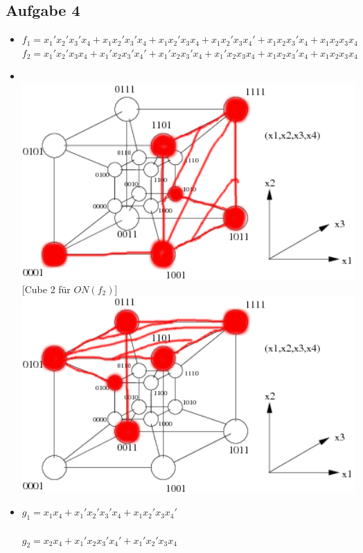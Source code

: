 \documentclass{scrartcl}
\begin{document}
	\subsection*{Aufgabe 4}
    \begin{itemize}
        \item[a)] 
            $f_1 = x_1'x_2'x_3'x_4 + x_1x_2'x_3'x_4  + x_1x_2'x_3x_4  + x_1x_2'x_3x_4' + x_1x_2x_3'x_4 + x_1x_2x_3x_4$ \\
            $f_2 = x_1'x_2'x_3x_4  + x_1'x_2x_3'x_4' + x_1'x_2x_3'x_4 + x_1'x_2x_3x_4 + x_1x_2x_3'x_4 + x_1x_2x_3x_4$
        \item[b)] [Cube 1 für $ON(f_1)$] \\
            \includegraphics[width=14cm]{hypercube1.png}
            [Cube 2 für $ON(f_2)$] \\
            \includegraphics[width=14cm]{hypercube2.png}

        \item[c)] $g_1 = x_1x_4 + x_1'x_2'x_3'x_4 + x_1x_2'x_3x_4' $ \\
            \\
            $g_2 = x_2x_4 + x_1'x_2x_3'x_4' + x_1'x_2'x_3x_4 $

    \end{itemize}
\end{document}
